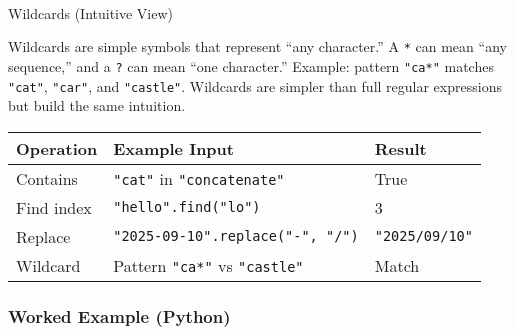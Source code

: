 \documentclass[
  letterpaper,
  DIV=11,
  numbers=noendperiod]{scrreprt}
\makeatletter
\let\oldparagraph\paragraph
\renewcommand{\paragraph}{
    \@ifstar
      \xxxParagraphStar
      \xxxParagraphNoStar
  }
\newcommand{\xxxParagraphStar}[1]{\oldparagraph*{#1}\mbox{}}
\newcommand{\xxxParagraphNoStar}[1]{\oldparagraph{#1}\mbox{}}
\makeatother
\begin{document}
\paragraph{Wildcards (Intuitive View)}\label{wildcards-intuitive-view}

Wildcards are simple symbols that represent ``any character.'' A
\texttt{*} can mean ``any sequence,'' and a \texttt{?} can mean ``one
character.'' Example: pattern \texttt{"ca*"} matches \texttt{"cat"},
\texttt{"car"}, and \texttt{"castle"}. Wildcards are simpler than full
regular expressions but build the same intuition.

\begin{longtable}[]{@{}lll@{}}
\toprule\noalign{}
Operation & Example Input & Result \\
\midrule\noalign{}
\endhead
\bottomrule\noalign{}
\endlastfoot
Contains & \texttt{"cat"} in \texttt{"concatenate"} & True \\
Find index & \texttt{"hello".find("lo")} & 3 \\
Replace & \texttt{"2025-09-10".replace("-",\ "/")} &
\texttt{"2025/09/10"} \\
Wildcard & Pattern \texttt{"ca*"} vs \texttt{"castle"} & Match \\
\end{longtable}

\subsubsection{Worked Example (Python)}\label{worked-example-python-13}
\end{document}
